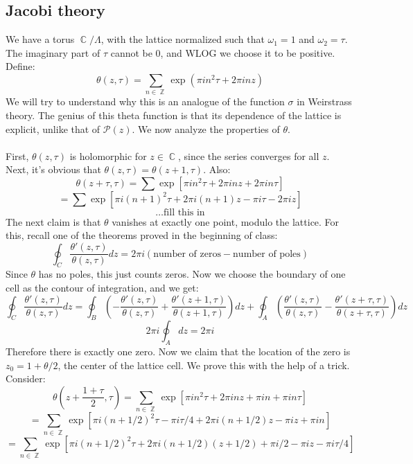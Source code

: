 \documentclass[12 pt]{article}
\DeclareMathOperator {\C} {\mathbb{C}}
\DeclareMathOperator {\Z} {\mathbb{Z}}
\theoremstyle{plain}
\theoremstyle{definition}
\theoremstyle{remark}
\begin{document}
\subsection*{Jacobi theory}
We have a torus $\C/\Lambda$, with the lattice normalized such that $\omega_1 = 1$ and $\omega_2 = \tau$. The imaginary part of $\tau$ cannot be 0, and WLOG we choose it to be positive. Define:
\[    \theta (z, \tau) = \sum_{n\in \Z} \exp \left( \pi i n^2 \tau + 2\pi in z  \right)    \]
We will try to understand why this is an analogue of the function $\sigma$ in Weirstrass theory. The genius of this theta function is that its dependence of the lattice is explicit, unlike that of $\mathcal{P}(z)$. We now analyze the properties of $\theta$.
\\
\\
First, $\theta(z, \tau)$ is holomorphic for $z\in \C$, since the series converges for all $z$. Next, it's obvious that $\theta(z, \tau) = \theta(z+1, \tau)$. Also:
\[    \theta(z + \tau, \tau) = \sum \exp\left[\pi i n^2 \tau + 2\pi in z  + 2\pi i n \tau  \right] \]
\[  =  \sum \exp\left[\pi i (n+1)^2 \tau + 2\pi i(n+1) z  - \pi i \tau - 2\pi i z  \right]    \]
\[      \dots \text{fill this in} \]
The next claim is that $\theta$ vanishes at exactly one point, modulo the lattice. For this, recall one of the theorems proved in the beginning of class:
\[   \oint_C \frac{\theta'(z,\tau)}{\theta(z, \tau)}  dz   = 2\pi i \left(\text{number of zeros} - \text{number of poles}  \right) \]
Since $\theta$ has no poles, this just counts zeros. Now we choose the boundary of one cell as the contour of integration, and we get:
\[       \oint_C \frac{\theta'(z,\tau)}{\theta(z, \tau)}  dz  =  \oint_B \left( - \frac{\theta'(z,\tau)}{\theta(z, \tau)} + \frac{\theta'(z+1,\tau)}{\theta(z+1, \tau)} \right) dz   +  \oint_A \left( \frac{\theta'(z,\tau)}{\theta(z, \tau)} - \frac{\theta'(z+ \tau,\tau)}{\theta(z+ \tau, \tau)} \right) dz           \]
\[    2\pi i \oint_A dz = 2\pi i      \]
Therefore there is exactly one zero. Now we claim that the location of the zero is $z_0 = 1+\theta/2$, the center of the lattice cell. We prove this with the help of a trick. Consider:
\[    \theta\left( z + \frac{1+\tau}{2} , \tau \right) = \sum_{n\in \Z} \exp \left[ \pi i n^2 \tau + 2\pi i n z + \pi i n + \pi i n \tau  \right]   \]
\[       =   \sum_{n\in \Z} \exp \left[ \pi i (n + 1/2)^2 \tau - \pi i \tau/4 + 2\pi i (n + 1/2)z - \pi i z + \pi i n   \right]   \]
\[       =     \sum_{n\in \Z} \exp \left[  \pi i (n + 1/2)^2 \tau + 2\pi i (n + 1/2) (z+ 1/2) + \pi i /2 - \pi i z - \pi i \tau/4  \right]    \]
\end{document}
